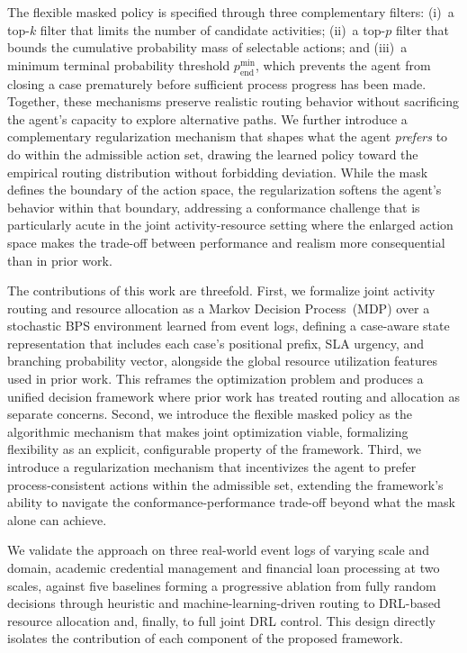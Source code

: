 \documentclass[journal,onecolumn]{IEEEtran}
\begin{document}
The flexible masked policy is specified through three complementary filters: (i)~a
top-$k$ filter that limits the number of candidate activities; (ii)~a top-$p$ filter
that bounds the cumulative probability mass of selectable actions; and (iii)~a
minimum terminal probability threshold $p_{\mathrm{end}}^{\min}$, which prevents
the agent from closing a case prematurely before sufficient process progress has been
made. Together, these mechanisms preserve realistic routing behavior without
sacrificing the agent's capacity to explore alternative paths. We further introduce a
complementary regularization mechanism that shapes what the agent \emph{prefers} to
do within the admissible action set, drawing the learned policy toward the empirical
routing distribution without forbidding deviation. While the mask defines the
boundary of the action space, the regularization softens the agent's behavior within
that boundary, addressing a conformance challenge that is particularly acute in the
joint activity-resource setting where the enlarged action space makes the trade-off
between performance and realism more consequential than in prior work.

The contributions of this work are threefold. First, we formalize joint activity
routing and resource allocation as a Markov Decision Process~(MDP) over a stochastic
BPS environment learned from event logs, defining a case-aware state representation
that includes each case's positional prefix, SLA urgency, and branching probability
vector, alongside the global resource utilization features used in prior work. This
reframes the optimization problem and produces a unified decision framework where
prior work has treated routing and allocation as separate concerns. Second, we
introduce the flexible masked policy as the algorithmic mechanism that makes joint
optimization viable, formalizing flexibility as an explicit, configurable property
of the framework. Third, we introduce a regularization mechanism that incentivizes
the agent to prefer process-consistent actions within the admissible set, extending
the framework's ability to navigate the conformance-performance trade-off beyond what
the mask alone can achieve.

We validate the approach on three real-world event logs of varying scale and
domain, academic credential management and financial loan processing at two
scales, against five baselines forming a progressive ablation from fully random
decisions through heuristic and machine-learning-driven routing to DRL-based resource
allocation and, finally, to full joint DRL control. This design directly isolates the
contribution of each component of the proposed framework.
\end{document}
